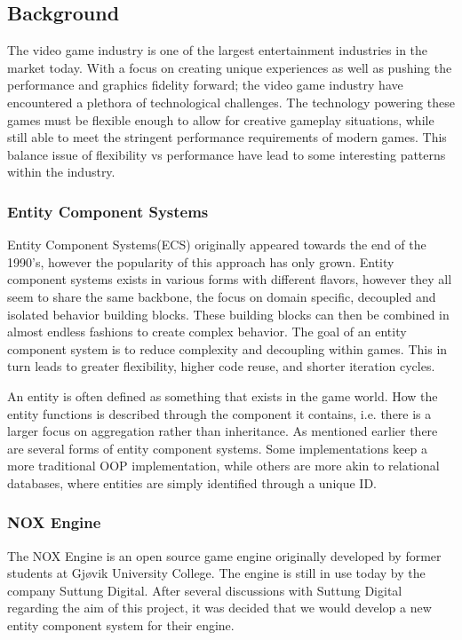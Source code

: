 \subsection{Background}
The video game industry is one of the largest entertainment industries in the market today. 
With a focus on creating unique experiences as well as pushing the performance and graphics fidelity
forward; the video game industry have encountered a plethora of technological challenges.
The technology powering these games must be flexible enough to allow for creative gameplay situations, 
while still able to meet the stringent performance requirements of modern games.
This balance issue of flexibility vs performance have lead to some interesting patterns within the industry.

\subsubsection{Entity Component Systems}
Entity Component Systems(ECS) originally appeared towards the end of the 1990's, 
however the popularity of this approach has only grown. 
\cite{wikipedia_ecs_history}
Entity component systems exists in various forms with different flavors,
however they all seem to share the same backbone, the focus on domain specific, 
decoupled and isolated behavior building blocks.
These building blocks can then be combined in almost endless fashions to create complex behavior. 
The goal of an entity component system is to reduce complexity and decoupling within games. 
This in turn leads to greater flexibility, higher code reuse, and shorter iteration cycles.

\noindent An entity is often defined as something that exists in the game world. 
How the entity functions is described through the component it contains, 
i.e. there is a larger focus on aggregation rather than inheritance. 
\cite[components]{game_programming_patterns}
As mentioned earlier there are several forms of entity component systems. 
Some implementations keep a more traditional OOP implementation, 
\cite[components]{game_programming_patterns}
while others are more akin to relational databases, 
where entities are simply identified through a unique ID. 
\cite{t_machine_ecs_are_the_future_p2} 

\subsubsection{NOX Engine}
The NOX Engine is an open source game engine originally developed by former students at Gj{\o}vik University College.
The engine is still in use today by the company Suttung Digital. 
After several discussions with Suttung Digital regarding the aim of this project, 
it was decided that we would develop a new entity component system for their engine. 